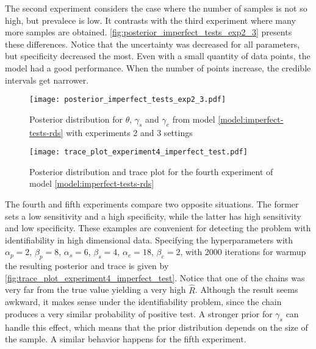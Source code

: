 The second experiment considers the case where the number of samples is not so
high, but prevalece is low. It contrasts with the third experiment where many
more samples are obtained. \autoref{fig:posterior_imperfect_tests_exp2_3}
presents these differences. Notice that the uncertainty was decreased for all
parameters, but specificity decreased the most. Even with a small quantity of
data points, the model had a good performance. When the number of points
increase, the credible intervals get narrower.

\begin{figure}[ht]
  \centering
  \caption{\label{fig:posterior_imperfect_tests_exp2_3} Posterior
    distribution for $\theta$, $\gamma_s$ and $\gamma_e$ from model
    \eqref{model:imperfect-tests-rds} with experiments 2 and 3 settings}
  \texttt{[image: posterior\_imperfect\_tests\_exp2\_3.pdf]}
\end{figure}

\begin{figure}[htbp]
  \centering
  \caption{\label{fig:trace_plot_experiment4_imperfect_test}Posterior distribution
    and trace plot for the fourth experiment of model
    \eqref{model:imperfect-tests-rds}}
  \texttt{[image: trace\_plot\_experiment4\_imperfect\_test.pdf]}
\end{figure}

The fourth and fifth experiments compare two opposite situations. The former
sets a low sensitivity and a high specificity, while the latter has high
sensitivity and low specificity. These examples are convenient for detecting
the problem with identifiability in high dimensional data. Specifying the hyperparameters with $\alpha_p =
  2$,  $\beta_p = 8$, $\alpha_s = 6$, $\beta_s = 4$, $\alpha_e = 18$, $\beta_e =
  2$, with 2000 iterations for warmup the resulting posterior and trace is given
by \autoref{fig:trace_plot_experiment4_imperfect_test}. Notice that one of the
chains was very far from the true value yielding a very high $\hat{R}$. Although
the result seems awkward, it makes sense under the identifiability problem,
since the chain produces a very similar probability of positive test. A
stronger prior for $\gamma_s$ can handle this effect, which means that the prior
distribution depends on the size of the sample. A similar behavior happens
for the fifth experiment.

